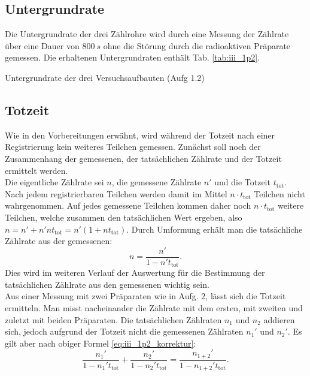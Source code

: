 \subsection{Untergrundrate}
Die Untergrundrate der drei Zählrohre wird durch eine Messung der Zählrate über eine Dauer von $\SI{800}{s}$ ohne die Störung durch die radioaktiven Präparate gemessen. Die erhaltenen Untergrundraten enthält Tab. \ref{tab:iii_1p2}.

\begin{table}[ht]
\centering
\caption{Untergrundrate der drei Versuchsaufbauten (Aufg 1.2)}
\label{tab:iii_1p2}

\end{table}

\subsection{Totzeit}
Wie in den Vorbereitungen erwähnt, wird während der Totzeit nach einer Registrierung kein weiteres Teilchen gemessen. Zunächst soll noch der Zusammenhang der gemessenen, der tatsächlichen Zählrate und der Totzeit ermittelt werden.\\
Die eigentliche Zählrate sei $n$, die gemessene Zählrate $n'$ und die Totzeit $t_\mathrm{tot}$. Nach jedem registrierbaren Teilchen werden damit im Mittel $n \cdot t_\mathrm{tot}$ Teilchen nicht wahrgenommen. Auf jedes gemessene Teilchen kommen daher noch $n \cdot t_\mathrm{tot}$ weitere Teilchen, welche zusammen den tatsächlichen Wert ergeben, also $n = n' + n'nt_\mathrm{tot} = n'(1+nt_\mathrm{tot})$. Durch Umformung erhält man die tatsächliche Zählrate aus der gemessenen:
\begin{equation}
n = \frac{n'}{1-n't_\mathrm{tot}}. \label{eq:iii_1p2_korrektur}
\end{equation}
Dies wird im weiteren Verlauf der Auswertung für die Bestimmung der tatsächlichen Zählrate aus den gemessenen wichtig sein.\\
Aus einer Messung mit zwei Präparaten wie in Aufg. 2, lässt sich die Totzeit ermitteln. Man misst nacheinander die Zählrate mit dem ersten, mit zweiten und zuletzt mit beiden Präparaten. Die tatsächlichen Zählraten $n_1$ und $n_2$ addieren sich, jedoch aufgrund der Totzeit nicht die gemessenen Zählraten $n_1'$ und $n_2'$. Es gilt aber nach obiger Formel \eqref{eq:iii_1p2_korrektur}:
\begin{equation}
\frac{n_1'}{1-n_1't_\mathrm{tot}} + \frac{n_2'}{1-n_2't_\mathrm{tot}} = \frac{n_{1+2}'}{1-n_{1+2}'t_\mathrm{tot}}.
\end{equation}
